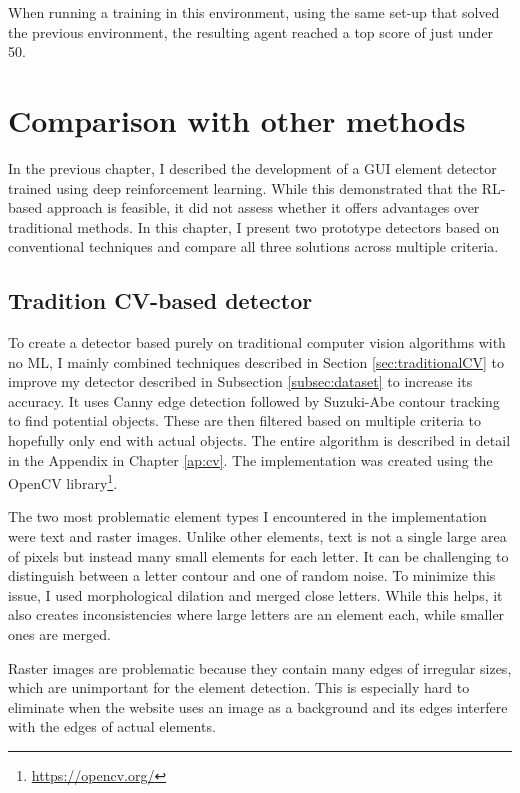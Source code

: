 \documentclass[
  digital,     %
  oneside,     %
  nosansbold,  %
  nocolorbold, %
  lof,         %
  lot,         %
]{fithesis4}
\begin{document}
When running a training in this environment, using the same set-up that solved the previous environment, the resulting agent reached a top score of just under 50.

\chapter{Comparison with other methods}

In the previous chapter, I described the development of a GUI element detector trained using deep reinforcement learning. While this demonstrated that the RL-based approach is feasible, it did not assess whether it offers advantages over traditional methods. In this chapter, I present two prototype detectors based on conventional techniques and compare all three solutions across multiple criteria.

\section{Tradition CV-based detector}
\label{sec:trad_cv_detector}

To create a detector based purely on traditional computer vision algorithms with no ML, I mainly combined techniques described in Section \ref{sec:traditionalCV} to improve my detector described in Subsection \ref{subsec:dataset} to increase its accuracy. It uses Canny edge detection followed by Suzuki-Abe contour tracking to find potential objects. These are then filtered based on multiple criteria to hopefully only end with actual objects. The entire algorithm is described in detail in the Appendix in Chapter \ref{ap:cv}. The implementation was created using the OpenCV library\footnote{\url{https://opencv.org/}}.

The two most problematic element types I encountered in the implementation were text and raster images. Unlike other elements, text is not a single large area of pixels but instead many small elements for each letter. It can be challenging to distinguish between a letter contour and one of random noise. To minimize this issue, I used morphological dilation and merged close letters. While this helps, it also creates inconsistencies where large letters are an element each, while smaller ones are merged.

Raster images are problematic because they contain many edges of irregular sizes, which are unimportant for the element detection. This is especially hard to eliminate when the website uses an image as a background and its edges interfere with the edges of actual elements.
\end{document}
